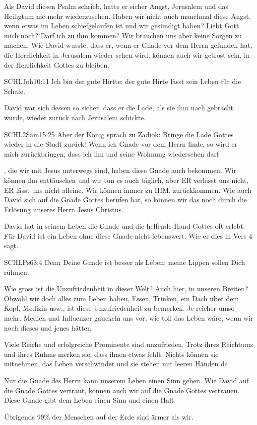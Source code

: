 \documentclass[fontsize=16pt]{mybib}
\begin{document}
    \begin{otsblock}
        Als David diesen Psalm schrieb, hatte er sicher Angst, Jerusalem und das Heiligtum nie mehr wiederzusehen. Haben wir nicht auch manchmal diese Angst, wenn etwas im Leben schiefgelaufen ist und wir gesündigt haben? Liebt Gott mich  noch? Darf ich  zu ihm kommen? Wir brauchen uns aber keine Sorgen zu machen. Wie David wusste, dass er, wenn er Gnade vor dem Herrn gefunden hat, die Herrlichkeit in Jerusalem wieder sehen wird, können auch wir getrost sein, in der Herrlichkeit Gottes zu bleiben. 
          \begin{bibelbox}{SCHL}{Joh}{10:11}
            Ich bin der gute Hirtte; der gute Hirte lässt sein Leben für die Schafe.
        \end{bibelbox}
        David war sich dessen so sicher, dass er die Lade, als sie ihm nach gebracht wurde, wieder zurück nach Jerusalem schickte.
        \begin{bibelbox}{SCHL}{2Sam}{15:25}
            Aber der König sprach zu Zadiok: Bringe die Lade Gottes wieder in die Stadt zurück! Wenn ich Gnade vor dem Herrn finde, so wird er mich zurückbringen, dass ich ihn und seine Wohnung wiedersehen darf
        \end{bibelbox}
        , die wir mit Jesus unterwegs sind, haben diese Gnade auch bekommen. Wir können ihn enttäuschen und wir tun es auch täglich, aber ER verlässt uns nicht, ER lässt uns nicht alleine. Wir können immer zu IHM,  zurückkommen. Wie auch David sich auf die Gnade Gottes berufen hat, so können wir das noch  durch die Erlösung unseres Herrn Jesus Christus.
    \end{otsblock}
    \begin{otsblock}
        David hat in seinem Leben die Gnade und die helfende Hand Gottes oft erlebt. Für David ist ein Leben ohne diese Gnade nicht lebenswert. Wie er dies in Vers 4 sagt.
        \begin{bibelbox}{SCHL}{Ps}{63:4}
            Denn Deine Gnade ist besser als Leben; meine Lippen sollen Dich rühmen.
        \end{bibelbox}
        Wie gross ist die Unzufriedenheit in dieser Welt? Auch hier, in unseren Breiten? Obwohl wir doch alles zum Leben haben, Essen, Trinken, ein Dach über dem Kopf, Medizin usw., ist diese Unzufriedenheit zu bemerken. Je reicher umso mehr. Medien und Influenzer gauckeln uns vor, wie toll das Leben wäre, wenn wir noch dieses und jenes hätten.
        
        Viele Reiche und erfolgreiche Prominente sind unzufrieden. Trotz ihres Reichtums und ihres Ruhms merken sie, dass ihnen etwas fehlt. Nichts können sie mitnehmen, das Leben verschwindet und sie stehen mit leeren Händen da.
        
        Nur die Gnade des Herrn kann unserem Leben einen Sinn geben. Wie David auf die Gnade Gottes vertraut, können auch wir auf die Gnade Gottes vertrauen. Diese Gnade gibt dem Leben einen Sinn und einen Halt.

        Übrigends 99\% der Menschen auf der Erde sind ärmer als wir.
    \end{otsblock}
\end{document}
